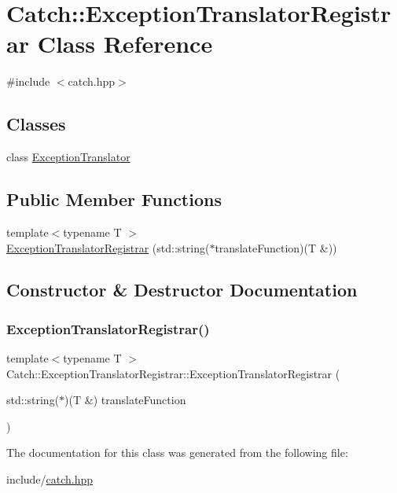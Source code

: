 \hypertarget{class_catch_1_1_exception_translator_registrar}{}\section{Catch\+::Exception\+Translator\+Registrar Class Reference}
\label{class_catch_1_1_exception_translator_registrar}


{\ttfamily \#include $<$catch.\+hpp$>$}

\subsection*{Classes}
\begin{DoxyCompactItemize}
\item 
class \mbox{\hyperlink{class_catch_1_1_exception_translator_registrar_1_1_exception_translator}{Exception\+Translator}}
\end{DoxyCompactItemize}
\subsection*{Public Member Functions}
\begin{DoxyCompactItemize}
\item 
{\footnotesize template$<$typename T $>$ }\\\mbox{\hyperlink{class_catch_1_1_exception_translator_registrar_aa73229de911f26b1df6c6c87c4d9e04e}{Exception\+Translator\+Registrar}} (std\+::string($\ast$translate\+Function)(T \&))
\end{DoxyCompactItemize}


\subsection{Constructor \& Destructor Documentation}
\mbox{\label{class_catch_1_1_exception_translator_registrar_aa73229de911f26b1df6c6c87c4d9e04e}} 
\subsubsection{\texorpdfstring{ExceptionTranslatorRegistrar()}{ExceptionTranslatorRegistrar()}}
{\footnotesize\ttfamily template$<$typename T $>$ \\
Catch\+::\+Exception\+Translator\+Registrar\+::\+Exception\+Translator\+Registrar (\begin{DoxyParamCaption}\item[{std\+::string($\ast$)(T \&)}]{translate\+Function }\end{DoxyParamCaption})\hspace{0.3cm}{\ttfamily [inline]}}



The documentation for this class was generated from the following file\+:\begin{DoxyCompactItemize}
\item 
include/\mbox{\hyperlink{catch_8hpp}{catch.\+hpp}}\end{DoxyCompactItemize}
